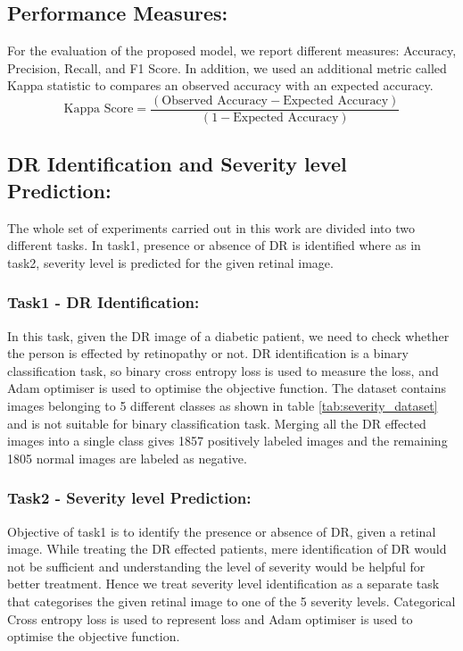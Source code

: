 \documentclass[electronics,article,accept ,moreauthors,pdftex]{mdpi}
\begin{document}
\subsection{Performance Measures:}
For the evaluation of the proposed model, we report different measures: Accuracy, Precision, Recall, and F1 Score. In addition, we used an additional metric called Kappa statistic to compares an observed accuracy with an expected accuracy.
\[\text{Kappa Score} = \frac{(\text{Observed Accuracy} -\text{Expected Accuracy})}{(1-\text{Expected Accuracy})}\]
\subsection{DR Identification and Severity level Prediction:}
The whole set of experiments carried out in this work are divided into two different tasks. In task1, presence or absence of DR is identified where as in task2,   severity level is predicted for the given retinal image.
\subsubsection{Task1 - DR Identification:}
In this task, given the DR image of a diabetic patient, we need to check whether the person is effected by retinopathy or not. DR identification is a binary classification task, so binary cross entropy loss is used to measure the loss, and Adam optimiser is used to optimise the objective function.
The dataset contains images belonging to 5 different  classes as shown in table \ref{tab:severity_dataset} and is not suitable for binary  classification task. Merging all the DR effected images into a single class gives 1857  positively labeled images and the remaining 1805 normal images are   labeled as negative. 


\subsubsection{Task2 - Severity level Prediction:}
Objective of task1 is to identify the presence or absence of DR, given a retinal image. While treating the DR effected patients, mere identification of DR would not be sufficient and understanding the level of severity would be helpful for better treatment. Hence we treat severity level identification as a  separate task that  categorises the given retinal image to one of the 5 severity levels. Categorical Cross entropy loss is used to represent loss and Adam optimiser is used to optimise the objective function. 
\end{document}
